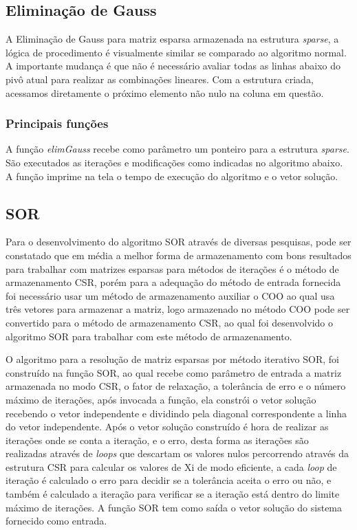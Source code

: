 \documentclass[
	article,			%
	11pt,				%
	oneside,			%
	a4paper,			%
	english,			%
	brazil,				%
	sumario=tradicional
	]{abntex2}
\begin{document}
\subsection{Eliminação de Gauss}
A Eliminação de Gauss para matriz esparsa armazenada na estrutura \textit{sparse}, a lógica de procedimento é visualmente similar se comparado ao algoritmo normal. A importante mudança é que não é necessário avaliar todas as linhas abaixo do pivô atual para realizar as combinações lineares. Com a estrutura criada, acessamos diretamente o próximo elemento não nulo na coluna em questão. \cite{sparseGauss}

\subsubsection{Principais funções}
A função \textit{elimGauss} recebe como parâmetro um ponteiro para a estrutura \textit{sparse}. São executados as iterações e modificações como indicadas no algoritmo abaixo. A função imprime na tela o tempo de execução do algoritmo e o vetor solução.

\subsection{SOR}
Para o desenvolvimento do algoritmo SOR através de diversas pesquisas, pode ser constatado que em média a melhor forma de armazenamento com bons resultados para trabalhar com matrizes esparsas para métodos de iterações é o método de armazenamento CSR, porém para a adequação do método de entrada fornecida foi necessário usar um método de armazenamento auxiliar o COO ao qual usa três vetores para armazenar a matriz, logo armazenado no método COO pode ser convertido para o método de armazenamento CSR, ao qual foi desenvolvido o algoritmo SOR para trabalhar com este método de armazenamento.

O algoritmo para a resolução de matriz esparsas por método iterativo SOR, foi construído na função SOR, ao qual recebe como parâmetro de entrada a matriz armazenada no modo CSR, o fator de relaxação, a tolerância de erro e o número máximo de iterações, após invocada a função, ela constrói o vetor solução recebendo o vetor independente e dividindo pela diagonal correspondente a linha do vetor independente. Após o vetor solução construído é hora de realizar as iterações onde se conta a iteração, e o erro, desta forma as iterações são realizadas através de \textit{loops} que descartam os valores nulos percorrendo através da estrutura CSR para calcular os valores de Xi de modo eficiente, a cada \textit{loop} de iteração é calculado o erro para decidir se a tolerância aceita o erro ou não, e também é calculado a iteração para verificar se a iteração está dentro do limite máximo de iterações. A função SOR tem como saída o vetor solução do sistema fornecido como entrada.
\end{document}
